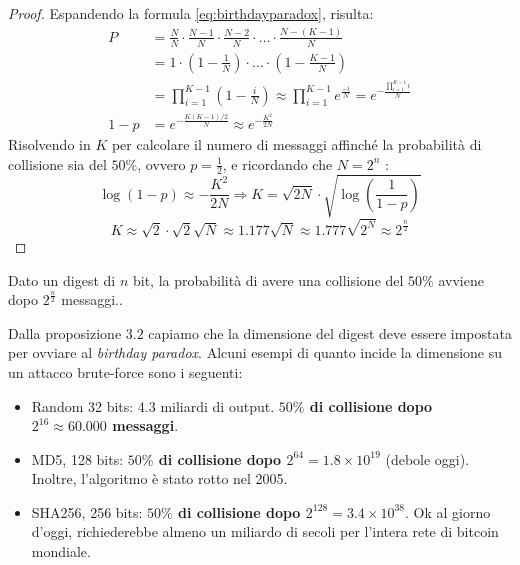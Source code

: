 \begin{proof}Espandendo la formula \cref{eq:birthdayparadox}, risulta:
\begin{equation*}\begin{aligned}
    P&=
    \frac{N}{N}\cdot\frac{N-1}{N}\cdot\frac{N-2}{N}\cdot\dots\cdot\frac{N-(K-1)}{N}\\
    &=1\cdot\left(1-\frac{1}{N}\right)\cdot\dots\cdot\left(1-\frac{K-1}{N}\right)\\
    &=\prod_{i=1}^{K-1}\left(1-\frac{i}{N}\right)\approx
    \prod_{i=1}^{K-1}e^{\frac{-i}{N}}=e^{-\frac{\prod_{i=1}^{K-1}i}{N}}\\
    1-p&=e^{-\frac{K(K-1)/2}{N}}\approx{e^{-\frac{K^2}{2N}}}
\end{aligned}
\end{equation*}
Risolvendo in $K$ per calcolare il numero di messaggi affinché la probabilità di collisione sia del $50\%$, ovvero $p=\frac{1}{2}$, e ricordando che $N=2^n$ :
\begin{equation*}
    \log(1-p)\approx{-\frac{K^2}{2N}}\Longrightarrow{K=\sqrt{2N}\cdot{\sqrt{\log\left(\frac{1}{1-p}\right)}}}
\end{equation*}
\[K\approx{\sqrt{2}\cdot\sqrt{2}\sqrt{N}}\approx{1.177\sqrt{N}}\approx{1.777\sqrt{2^N}}\approx2^{\frac{n}{2}}\]
\end{proof}
\begin{proposition}
Dato un digest di $n$ bit, la probabilità di avere una collisione del $50\%$ avviene dopo $2^{\frac{n}{2}}$ messaggi..
\end{proposition}
Dalla proposizione $3.2$ capiamo che la dimensione del digest deve essere impostata per ovviare al \textit{birthday paradox}. Alcuni esempi di quanto incide la dimensione su un attacco brute-force sono i seguenti:
\begin{itemize}
    \item Random 32 bits: 4.3 miliardi di output. \textbf{$50\%$ di collisione dopo $2^{16}\approx60.000$ messaggi}.
    \item MD5, 128 bits: \textbf{$50\%$ di collisione dopo $2^{64}=1.8\times10^{19}$} (debole oggi). Inoltre, l'algoritmo è stato rotto nel 2005.
    \item SHA256, 256 bits: \textbf{$50\%$ di collisione dopo $2^{128}=3.4\times10^{38}$}. Ok al giorno d'oggi, richiederebbe almeno un miliardo di secoli per l'intera rete di bitcoin mondiale.
\end{itemize}
